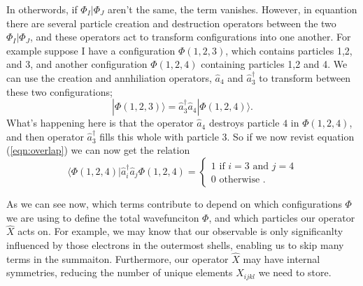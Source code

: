 \documentclass[12pt]{article}
\begin{document}
In otherwords, if $\Phi_{I} | \Phi_{J}$ aren't the same, the term vanishes. However, in equantion 
\label{eqn:2el_expectation} there are several particle creation and destruction operators between the 
two $\Phi_{I} | \Phi_{J}$, and these operators act to transform configurations into one another. For example suppose
I have a configuration $\Phi(1,2,3)$, which contains particles 1,2, and 3, and another configuration $\Phi(1,2,4)$ 
containing particles 1,2 and 4. We can use the creation and annhiliation operators, $\hat{a}_{4}$
and $\hat{a}_{3}^{\dagger}$  to transform between these two configurations;
\begin{equation}
|\Phi(1,2,3)\rangle = \hat{a}_{3}^{\dagger}\hat{a}_{4} |\Phi(1,2,4)\rangle.
\end{equation}
What's happening here is that the operator $\hat{a}_{4}$ destroys particle $4$ in $\Phi(1,2,4)$, and then 
operator $\hat{a}^{\dagger}_{3}$ fills this whole with particle $3$. So if we now revist equation (\ref{eqn:overlap})
we can now get the relation 
\begin{equation}
\langle \Phi(1,2,4) |\hat{a}_{i}^{\dagger}\hat{a}_{j} \Phi(1,2,4) =
\begin{cases}
1 \text{\  \ \ \  \ \ \ \ if } i=3 \text{ \ \ and \ \ } j =4 \\
0 \text{ \ \ otherwise }. 
\end{cases}
\label{eqn:overlap_specific}
\end{equation}

As we can see now, which terms contribute to \label{eqn:2el_expectation} depend on which configurations $\Phi$ we are using to 
define the total wavefunciton $\Phi$, and which particles our operator $\hat{X}$ acts on. For example, we may know that 
our observable  is only significanlty influenced by those electrons in the outermost shells, enabling us to skip many terms in the 
summaiton. Furthermore, our operator $\hat{X}$ may have internal symmetries, reducing the number of unique elements $X_{ijkl}$ 
we need to store.\\
\end{document}
